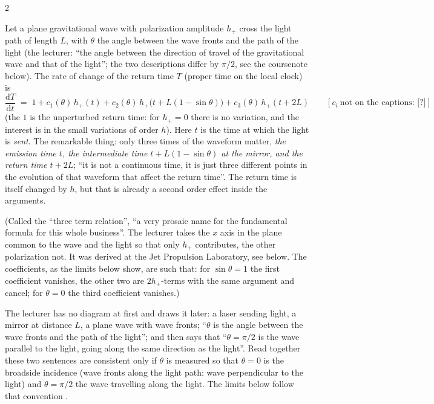 \begin{paracol}{2}
\begin{theorem}\label{thm:c28-three}
Let a plane gravitational wave with polarization amplitude $h_+$ cross the light path of length $L$, with $\theta$ the angle between the wave fronts and the path of the light (the lecturer: ``the angle between the direction of travel of the gravitational wave and that of the light''; the two descriptions differ by $\pi/2$, see the coursenote below). The rate of change of the return time $T$ (proper time on the local clock) is
\[
  \frac{\mathrm dT}{\mathrm dt}\;=\;1+c_1(\theta)\,h_+(t)+c_2(\theta)\,h_+\bigl(t+L(1-\sin\theta)\bigr)+c_3(\theta)\,h_+(t+2L)\qquad[c_i\ \text{not on the captions: [?]}]
\]
(the $1$ is the unperturbed return time: for $h_+=0$ there is no variation, and the interest is in the small variations of order $h$). Here $t$ is the time at which the light is \emph{sent}. The remarkable thing: only three times of the waveform matter, \emph{the emission time $t$, the intermediate time $t+L(1-\sin\theta)$ at the mirror, and the return time $t+2L$}; ``it is not a continuous time, it is just three different points in the evolution of that waveform that affect the return time''. The return time is itself changed by $h$, but that is already a second order effect inside the arguments.
\end{theorem}

(Called the ``three term relation'', ``a very prosaic name for the fundamental formula for this whole business''. The lecturer takes the $x$ axis in the plane common to the wave and the light so that only $h_+$ contributes, the other polarization not. It was derived at the Jet Propulsion Laboratory, see below. The coefficients, as the limits below show, are such that: for $\sin\theta=1$ the first coefficient vanishes, the other two are $2h_+$-terms with the same argument and cancel; for $\theta=0$ the third coefficient vanishes.)

\begin{coursenote}
The lecturer has no diagram at first and draws it later: a laser sending light, a mirror at distance $L$, a plane wave with wave fronts; ``$\theta$ is the angle between the wave fronts and the path of the light''; and then says that ``$\theta=\pi/2$ is the wave parallel to the light, going along the same direction as the light''. Read together these two sentences are consistent only if $\theta$ is measured so that $\theta=0$ is the broadside incidence (wave fronts along the light path: wave perpendicular to the light) and $\theta=\pi/2$ the wave travelling along the light. The limits below follow that convention .
\end{coursenote}


\end{paracol}
